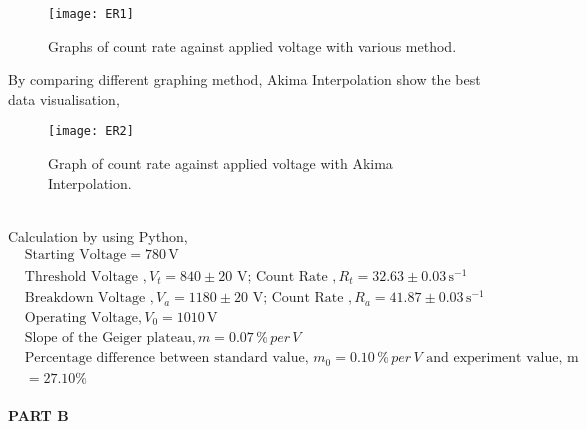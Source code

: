 \documentclass[a4paper,11pt]{article}
\begin{document}
\begin{figure}[h!]
\centering
    \texttt{[image: ER1]}
    \caption{Graphs of count rate against applied voltage with various method.}
\label{fig:setupC}
\end{figure}
\newpage
\noindent By comparing different graphing method, Akima Interpolation show the best data visualisation,
\begin{figure}[h!]
\centering
    \texttt{[image: ER2]}
    \caption{Graph of  count rate against applied voltage with Akima Interpolation.}
    \label{fig:setupC}
\end{figure}
\\
Calculation by using Python,
\begin{align*}
&\text{Starting Voltage} = 780 \, \text{V} \\
&\text{Threshold Voltage } ,V_t= 840 \pm 20 \,\, \text{V};\,\text{Count Rate },R_t = 32.63 \pm 0.03 \,\text{s}^{-1}\\
&\text{Breakdown Voltage },V_a =1180 \pm 20 \,\, \text{V};\,\text{Count Rate },R_a = 41.87 \pm 0.03 \,\text{s}^{-1}\\
&\text{Operating Voltage}, V_0  = 1010 \, \text{V}\\
&\text{Slope of the Geiger plateau}, m =0.07\,\%\,per\,V \\
& \text{Percentage difference between standard value, $m_0=0.10\,\%\,per\,V$ and experiment value, m}\\
&= 27.10\%
\end{align*}
\\
\newpage
\noindent \textbf{PART B}
\end{document}
